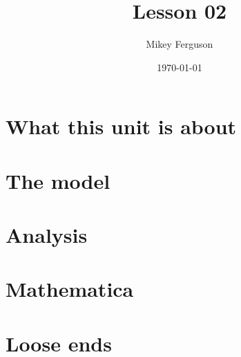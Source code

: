 \documentclass[11pt]{article}
\title{Lesson 02}
\author{Mikey Ferguson}
\date{\today}
\begin{document}
\maketitle
\tableofcontents
\bigskip

\section{What this unit is about}

\section{The model}

\section{Analysis}

\section{Mathematica}

\section{Loose ends}
\end{document}
